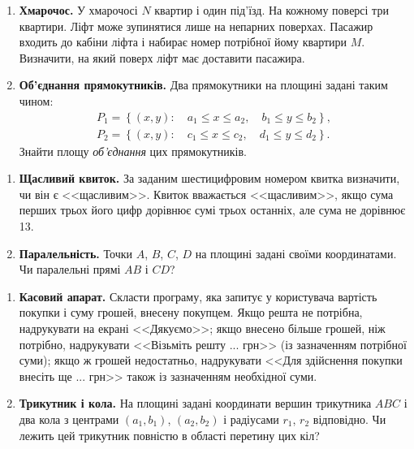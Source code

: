 	
	{\large
		\begin{enumerate}
			\item \textbf{Хмарочос.} У хмарочосі $N$ квартир і один під'їзд. На кожному поверсі три квартири. Ліфт може зупинятися лише на непарних поверхах. Пасажир входить до кабіни ліфта і набирає номер потрібної йому квартири $M$. Визначити, на який поверх ліфт має доставити пасажира.
			\item \textbf{Об'єднання прямокутників.} Два прямокутники на площині задані таким чином:
			$$
			\begin{array}{c}
				P_1 = \left\{(x, y):\quad a_1\leqslant x\leqslant a_2,\quad b_1\leqslant y\leqslant b_2\right\},\\ 
				P_2 = \left\{(x, y):\quad c_1\leqslant x\leqslant c_2,\quad d_1\leqslant y\leqslant d_2\right\}.
			\end{array}
			$$
			Знайти площу {\itshape об'єднання} цих прямокутників.
		\end{enumerate}
	}
	

	
	
	{\large
		\begin{enumerate}
			\item \textbf{Щасливий квиток.} За заданим шестицифровим номером квитка визначити, чи він є <<щасливим>>. Квиток вважається <<щасливим>>, якщо сума перших трьох його цифр дорівнює сумі трьох останніх, але сума не дорівнює 13.
			\item \textbf{Паралельність.} Точки $A$, $B$, $C$, $D$ на площині задані своїми координатами. Чи паралельні прямі $AB$ і $CD$?
		\end{enumerate}
	}
	
	
	
	
	{\large
		\begin{enumerate}
			\item \textbf{Касовий апарат.} Скласти програму, яка запитує у користувача вартість покупки і суму грошей, внесену покупцем. Якщо решта не потрібна, надрукувати на екрані <<Дякуємо>>; якщо внесено більше грошей, ніж потрібно, надрукувати <<Візьміть решту ... грн>> (із зазначенням потрібної суми); якщо ж грошей недостатньо, надрукувати <<Для здійснення покупки внесіть ще ... грн>> також із зазначенням необхідної суми.
			\item \textbf{Трикутник і кола.} На площині задані координати вершин трикутника $ABC$ і два кола з центрами $\left(a_1, b_1\right)$, $\left(a_2, b_2\right)$ і радіусами $r_1$, $r_2$ відповідно. Чи лежить цей трикутник повністю в області перетину цих кіл?
		\end{enumerate}
	}
	
